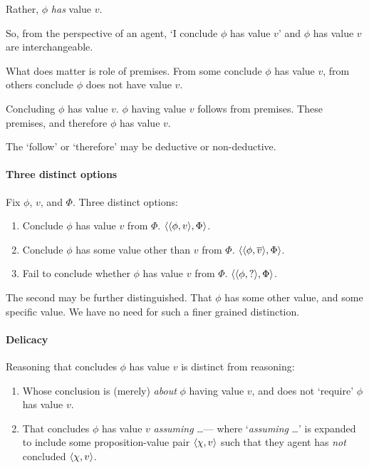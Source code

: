 \begin{note}[`Concluding']
  Rather, \(\phi\) \emph{has} value \(v\).

  So, from the perspective of an agent, `I conclude \(\phi\) has value \(v\)' and \(\phi\) has value \(v\) are interchangeable.
\end{note}

\begin{note}
  What does matter is role of premises.
  From some conclude \(\phi\) has value \(v\), from others conclude \(\phi\) does not have value \(v\).
\end{note}

\begin{note}[Generally]
  Concluding \(\phi\) has value \(v\).
  \(\phi\) having value \(v\) follows from premises.
  These premises, and therefore \(\phi\) has value \(v\).

  The `follow' or `therefore' may be deductive or non-deductive.
\end{note}

\paragraph{Three distinct options}

\begin{assumption}
  Fix \(\phi\), \(v\), and \(\Phi\).
  Three distinct options:
  \begin{enumerate}
  \item Conclude \(\phi\) has value \(v\) from \(\Phi\).
    \(\langle \langle \phi, v \rangle, \Phi \rangle\).
  \item
    Conclude \(\phi\) has some value other than \(v\) from \(\Phi\).
    \(\langle \langle \phi, \overline{v} \rangle, \Phi \rangle\).
  \item
    Fail to conclude whether \(\phi\) has value \(v\) from \(\Phi\).
    \(\langle \langle \phi, ? \rangle, \Phi \rangle\).
  \end{enumerate}
  The second may be further distinguished.
  That \(\phi\) has some other value, and some specific value.
  We have no need for such a finer grained distinction.
\end{assumption}


\paragraph{Delicacy}

\begin{note}
  Reasoning that concludes \(\phi\) has value \(v\) is distinct from reasoning:
  \begin{enumerate}[label=\Alph*., ref=(\Alph*)]
  \item
    \label{CS:delicacy:O}
    Whose conclusion is (merely) \emph{about} \(\phi\) having value \(v\), and does not `require' \(\phi\) has value \(v\).
  \item
    \label{CS:delicacy:A}
    That concludes \(\phi\) has value \(v\) \emph{assuming} \dots\space --- where `\emph{assuming} \dots\space' is expanded to include some proposition-value pair \(\langle \chi, v \rangle\) such that they agent has \emph{not} concluded \(\langle \chi, v \rangle\).
  \end{enumerate}
\end{note}

